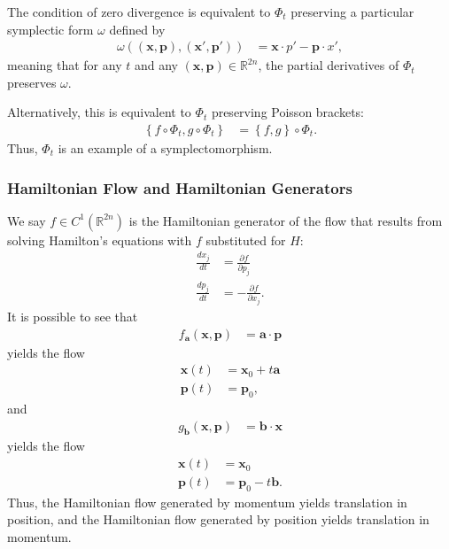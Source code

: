 \documentclass[10pt]{extarticle}
\newcommand{\R}{\mathbb{R}}
\newcommand{\set}[1]{\left\{#1\right\}}
\theoremstyle{plain}
\theoremstyle{definition}
\theoremstyle{remark}
\renewcommand{\newline}{\hfill\break}
\begin{document}
  The condition of zero divergence is equivalent to $\Phi_t$ preserving a particular symplectic form $\omega$ defined by
  \begin{align*}
    \omega\left((\mathbf{x},\mathbf{p}),(\mathbf{x}',\mathbf{p}')\right) &= \mathbf{x}\cdot p' - \mathbf{p}\cdot x',
  \end{align*}
  meaning that for any $t$ and any $(\mathbf{x},\mathbf{p})\in \R^{2n}$, the partial derivatives of $\Phi_t$ preserves $\omega$.\newline

  Alternatively, this is equivalent to $\Phi_t$ preserving Poisson brackets:
  \begin{align*}
    \set{f\circ \Phi_t,g\circ\Phi_t} &= \set{f,g}\circ \Phi_t.
  \end{align*}
  Thus, $\Phi_t$ is an example of a symplectomorphism.
  \subsubsection{Hamiltonian Flow and Hamiltonian Generators}%
  We say $f\in C^{1}(\R^{2n})$ is the Hamiltonian generator of the flow that results from solving Hamilton's equations with $f$ substituted for $H$:
  \begin{align*}
    \frac{dx_j}{dt} &= \frac{\partial f}{\partial p_j}\\
    \frac{dp_j}{dt} &= -\frac{\partial f}{\partial x_j}.
  \end{align*}
  It is possible to see that
  \begin{align*}
    f_{\mathbf{a}}(\mathbf{x},\mathbf{p}) &= \mathbf{a}\cdot \mathbf{p}
  \end{align*}
  yields the flow
  \begin{align*}
    \mathbf{x}(t) &= \mathbf{x}_0 + t\mathbf{a}\\
    \mathbf{p}(t) &= \mathbf{p}_0,
  \end{align*}
  and
  \begin{align*}
    g_{\mathbf{b}}(\mathbf{x},\mathbf{p}) &= \mathbf{b}\cdot \mathbf{x}
  \end{align*}
  yields the flow
  \begin{align*}
    \mathbf{x}(t) &= \mathbf{x}_0\\
    \mathbf{p}(t) &= \mathbf{p}_0 - t\mathbf{b}.
  \end{align*}
  Thus, the Hamiltonian flow generated by momentum yields translation in position, and the Hamiltonian flow generated by position yields translation in momentum.\newline
\end{document}

